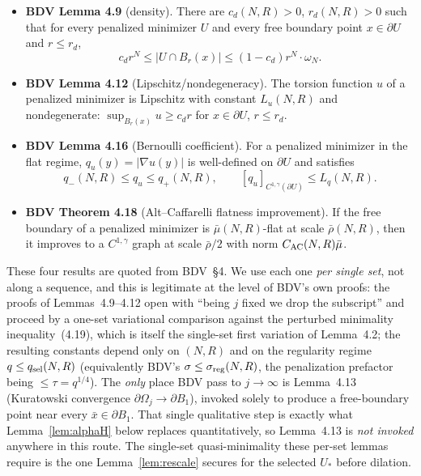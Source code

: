 \documentclass[11pt]{amsart}
\theoremstyle{definition}
\newcommand{\abs}[1]{\left|#1\right|}
\begin{document}
\begin{itemize}
\item \textbf{BDV Lemma 4.9} (density). There are
$c_d(N,R)>0$, $r_d(N,R)>0$ such that for every penalized minimizer $U$ and
every free boundary point $x\in\partial U$ and $r\le r_d$,
\[
c_d r^N\le\abs{U\cap B_r(x)}\le(1-c_d)r^N\cdot\omega_N.
\]

\item \textbf{BDV Lemma 4.12} (Lipschitz/nondegeneracy). The torsion
function $u$ of a penalized minimizer is Lipschitz with constant $L_u(N,R)$
and nondegenerate: $\sup_{B_r(x)}u\ge c_d r$ for $x\in\partial U$, $r\le r_d$.

\item \textbf{BDV Lemma 4.16} (Bernoulli coefficient). For a penalized
minimizer in the flat regime, $q_u(y)=\abs{\nabla u(y)}$ is well-defined on
$\partial U$ and satisfies
\[
q_-(N,R)\le q_u\le q_+(N,R),\qquad[q_u]_{C^{1,\gamma}(\partial U)}\le L_q(N,R).
\]

\item \textbf{BDV Theorem 4.18} (Alt--Caffarelli flatness improvement). If
the free boundary of a penalized minimizer is $\bar\mu(N,R)$-flat at scale
$\bar\rho(N,R)$, then it improves to a $C^{1,\gamma}$ graph at scale
$\bar\rho/2$ with norm $C_{\rm AC}(N,R)\bar\mu$.
\end{itemize}

These four results are quoted from BDV~\S 4. We use each one \emph{per single
set}, not along a sequence, and this is legitimate at the level of BDV's own
proofs: the proofs of Lemmas~4.9--4.12 open with ``being $j$ fixed we drop the
subscript'' and proceed by a one-set variational comparison against the
perturbed minimality inequality~(4.19), which is itself the single-set first
variation of Lemma~4.2; the resulting constants depend only on $(N,R)$ and on
the regularity regime $q\le q_{\rm sel}(N,R)$ (equivalently BDV's
$\sigma\le\sigma_{\rm reg}(N,R)$, the penalization prefactor being
$\le\tau=q^{1/4}$). The \emph{only} place BDV pass to $j\to\infty$ is
Lemma~4.13 (Kuratowski convergence $\partial\Omega_j\to\partial B_1$), invoked
solely to produce a free-boundary point near every $\bar x\in\partial B_1$.
That single qualitative step is exactly what Lemma~\ref{lem:alphaH} below
replaces quantitatively, so Lemma~4.13 is \emph{not invoked} anywhere in this
route. The single-set quasi-minimality these per-set lemmas require is the one
Lemma~\ref{lem:rescale} secures for the selected $U_*$ before dilation.
\end{document}
